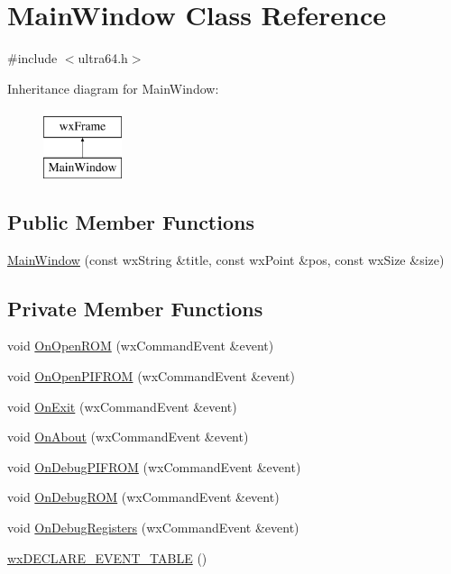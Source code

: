 \hypertarget{class_main_window}{}\section{Main\+Window Class Reference}
\label{class_main_window}


{\ttfamily \#include $<$ultra64.\+h$>$}

Inheritance diagram for Main\+Window\+:\begin{figure}[H]
\begin{center}
\leavevmode
\includegraphics[height=2.000000cm]{class_main_window}
\end{center}
\end{figure}
\subsection*{Public Member Functions}
\begin{DoxyCompactItemize}
\item 
\hyperlink{class_main_window_ab5bd7c178471f31f5c7f20fad6446382}{Main\+Window} (const wx\+String \&title, const wx\+Point \&pos, const wx\+Size \&size)
\end{DoxyCompactItemize}
\subsection*{Private Member Functions}
\begin{DoxyCompactItemize}
\item 
void \hyperlink{class_main_window_a28e8accc0a0157573cd8f9aad24c0c70}{On\+Open\+R\+OM} (wx\+Command\+Event \&event)
\item 
void \hyperlink{class_main_window_a593f2d52215a2cf7d8cf79ae1e792df9}{On\+Open\+P\+I\+F\+R\+OM} (wx\+Command\+Event \&event)
\item 
void \hyperlink{class_main_window_a1a605e490ac5deeb89ed16cfc871bf3f}{On\+Exit} (wx\+Command\+Event \&event)
\item 
void \hyperlink{class_main_window_afa16bbfe7c1f9f4ba9192210ca68d996}{On\+About} (wx\+Command\+Event \&event)
\item 
void \hyperlink{class_main_window_ad417cf49adddf2caaab6b42eaca297e3}{On\+Debug\+P\+I\+F\+R\+OM} (wx\+Command\+Event \&event)
\item 
void \hyperlink{class_main_window_af112afb589538613e918372017a64084}{On\+Debug\+R\+OM} (wx\+Command\+Event \&event)
\item 
void \hyperlink{class_main_window_a19dd4cc763eefb616417f390a5ecd1fa}{On\+Debug\+Registers} (wx\+Command\+Event \&event)
\item 
\hyperlink{class_main_window_ae2ff5d7859e51963c5c07ab11583021a}{wx\+D\+E\+C\+L\+A\+R\+E\+\_\+\+E\+V\+E\+N\+T\+\_\+\+T\+A\+B\+LE} ()
\end{DoxyCompactItemize}


